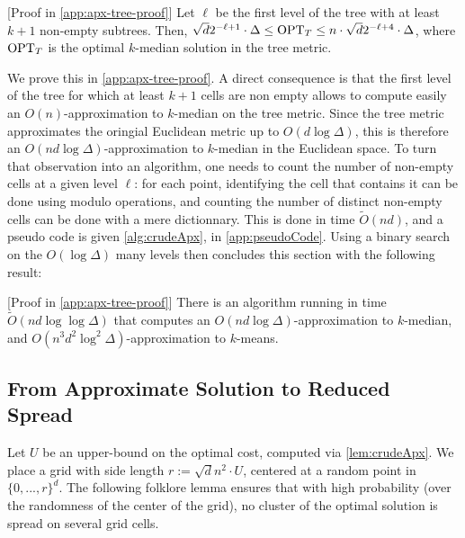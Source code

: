 \begin{lemma}\label{lem:apxTree}
[Proof in \cref{app:apx-tree-proof}] Let $\ell$ be the first level of the tree with at least $k+1$ non-empty subtrees. Then, $\sqrt{d}2^{-\ell+1} \cdot \Delta \leq
\text{OPT}_T \leq n \cdot \sqrt{d}2^{-\ell+4} \cdot \Delta$, where $\text{OPT}_T$ is the optimal $k$-median solution in the tree metric.
\end{lemma}

We prove this in \cref{app:apx-tree-proof}. A direct consequence  is that the first level of the tree for which at least
$k+1$ cells are non empty allows to compute easily an $O(n)$-approximation to $k$-median on the tree metric. Since the tree metric approximates the oringial Euclidean metric up to $O(d \log \Delta)$, this is therefore an $O(n d \log \Delta)$-approximation to $k$-median in the Euclidean space.
 To turn that observation into an algorithm, one needs to count the number of non-empty cells at a given level $\ell$: for each point, identifying the cell that contains it can be done using modulo operations, and counting the number of distinct non-empty cells can be done with a mere dictionnary.
This is done in time $\tilde O(nd)$, and a pseudo code is given \cref{alg:crudeApx}, in \cref{app:pseudoCode}.  Using a binary search on the $O(\log \Delta)$ many levels then concludes this section with the following result:

\begin{lemma}\label{lem:crudeApx}[Proof in \cref{app:apx-tree-proof}]
There is an algorithm running in time $\tilde O(nd \log \log \Delta)$ that computes an $O(n d \log \Delta)$-approximation to $k$-median, and $O(n^3 d^2 \log^2 \Delta)$-approximation to $k$-means.
\end{lemma}



\subsection{From Approximate Solution to Reduced Spread}
\label{ssec:reduce_spread}

Let $U$ be an upper-bound on the optimal cost, computed via \cref{lem:crudeApx}. We place a grid with side length $r:= \sqrt{d} n^2\cdot U$, centered at a random point in $\{0, ..., r\}^d$.
The following folklore lemma ensures that with high probability (over the randomness of the center of the grid), no cluster of the optimal solution is spread on several grid cells.

